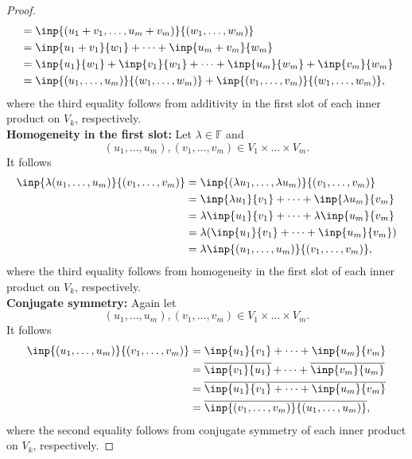 \documentclass{extarticle}
\newcommand{\F}{\mathbb{F}}
\newcommand\widebar[1]{\mathop{\overline{#1}}}
\begin{document}
\begin{proof}
\begin{align*}
&= \inp{(u_1 + v_1, \dots, u_m + v_m)}{(w_1,\dots, w_m)}\\
&= \inp{u_1 + v_1}{w_1} + \dots + \inp{u_m + v_m}{w_m}\\
&= \inp{u_1}{w_1} + \inp{v_1}{w_1} + \dots + \inp{u_m}{w_m} + \inp{v_m}{w_m}\\
&= \inp{(u_1,\dots,u_m)}{(w_1,\dots, w_m)} + \inp{(v_1,\dots, v_m)}{(w_1,\dots,w_m)},
\end{align*}
where the third equality follows from additivity in the first slot of each inner product on $V_k$, respectively.\\
\textbf{Homogeneity in the first slot: } Let $\lambda\in\F$ and 
\begin{equation*}
(u_1,\dots, u_m),(v_1,\dots, v_m)\in V_1\times \dots \times V_m.
\end{equation*}
It follows
\begin{align*}
\inp{\lambda(u_1,\dots, u_m)}{(v_1,\dots, v_m)} &= \inp{(\lambda u_1,\dots, \lambda u_m)}{(v_1,\dots, v_m)} \\
&= \inp{\lambda u_1}{v_1} + \dots + \inp{\lambda u_m}{v_m}\\
&= \lambda\inp{u_1}{v_1} + \dots + \lambda\inp{u_m}{v_m}\\
&= \lambda(\inp{u_1}{v_1} + \dots + \inp{u_m}{v_m})\\
&=\lambda\inp{(u_1,\dots, u_m)}{(v_1,\dots, v_m)},
\end{align*}
where the third equality follows from homogeneity in the first slot of each inner product on $V_k$, respectively.\\
\textbf{Conjugate symmetry: } Again let
\begin{equation*}
(u_1,\dots, u_m),(v_1,\dots, v_m)\in V_1\times \dots \times V_m.
\end{equation*}
It follows
\begin{align*}
\inp{(u_1,\dots, u_m)}{(v_1,\dots, v_m)} &=  \inp{u_1}{v_1} + \dots + \inp{u_m}{v_m}\\
&= \widebar{\inp{v_1}{u_1}} + \dots + \widebar{\inp{v_m}{u_m}}\\
&= \widebar{\inp{u_1}{v_1} + \dots + \inp{u_m}{v_m}}\\
&= \widebar{\inp{(v_1,\dots, v_m)}{(u_1,\dots, u_m)}},
\end{align*}
where the second equality follows from conjugate symmetry of each inner product on $V_k$, respectively.
\end{proof}
\end{document}
